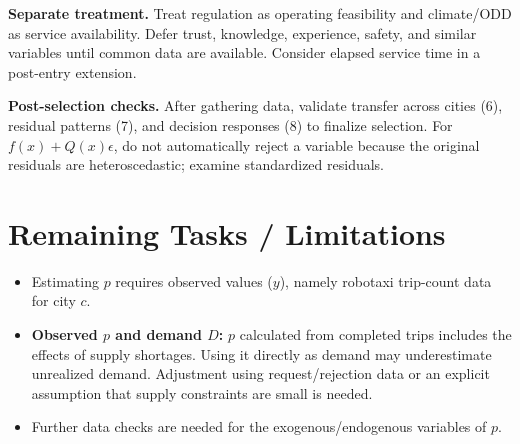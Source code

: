 \documentclass[10pt,a4paper]{article}
\begin{document}
\textbf{Separate treatment.} Treat regulation as operating feasibility and climate/ODD as service availability. Defer trust, knowledge, experience, safety, and similar variables until common data are available. Consider elapsed service time in a post-entry extension.

\textbf{Post-selection checks.} After gathering data, validate transfer across cities (6), residual patterns (7), and decision responses (8) to finalize selection. For $f(x)+Q(x)\epsilon$, do not automatically reject a variable because the original residuals are heteroscedastic; examine standardized residuals.

\section{Remaining Tasks / Limitations}
\begin{itemize}
\item Estimating $p$ requires observed values ($y$), namely robotaxi trip-count data for city $c$.
\item \textbf{Observed $p$ and demand $D$:} $p$ calculated from completed trips includes the effects of supply shortages. Using it directly as demand may underestimate unrealized demand. Adjustment using request/rejection data or an explicit assumption that supply constraints are small is needed.
\item Further data checks are needed for the exogenous/endogenous variables of $p$.
\end{itemize}
\end{document}
